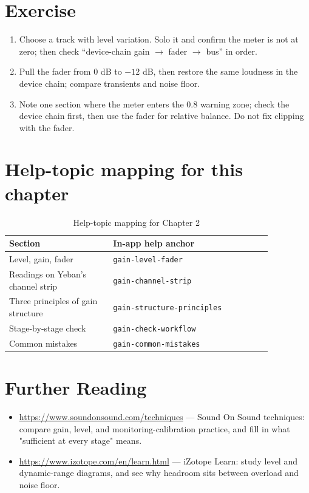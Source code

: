 \section{Exercise}


\begin{exercise}
\begin{enumerate}
  \item Choose a track with level variation. Solo it and confirm the meter is not at zero; then check ``device-chain gain $\to$ fader $\to$ bus'' in order.
  \item Pull the fader from 0 dB to $-12$ dB, then restore the same loudness in the device chain; compare transients and noise floor.
  \item Note one section where the meter enters the 0.8 warning zone; check the device chain first, then use the fader for relative balance. Do not fix clipping with the fader.
\end{enumerate}
\end{exercise}

\section{Help-topic mapping for this chapter}

\begin{table}[htbp]
\centering
\small
\begin{tabular}{@{}p{0.34\linewidth}p{0.52\linewidth}@{}}
\hline
Section & In-app help anchor \\
\hline
Level, gain, fader & \texttt{gain-level-fader} \\
Readings on Yeban's channel strip & \texttt{gain-channel-strip} \\
Three principles of gain structure & \texttt{gain-structure-principles} \\
Stage-by-stage check & \texttt{gain-check-workflow} \\
Common mistakes & \texttt{gain-common-mistakes} \\
\hline
\end{tabular}
\caption{Help-topic mapping for Chapter 2}
\end{table}

\section*{Further Reading}
\begin{itemize}[leftmargin=1.5em]
\item \url{https://www.soundonsound.com/techniques} — Sound On Sound techniques: compare gain, level, and monitoring-calibration practice, and fill in what "sufficient at every stage" means.
\item \url{https://www.izotope.com/en/learn.html} — iZotope Learn: study level and dynamic-range diagrams, and see why headroom sits between overload and noise floor.
\end{itemize}
